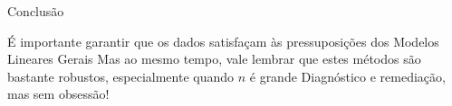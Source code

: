 \documentclass{beamer}\usepackage[]{graphicx}\usepackage[]{color}
\begin{document}
\begin{frame}{Conclusão}

É importante garantir que os dados satisfaçam às pressuposições dos Modelos Lineares Gerais\pause
\vfill
Mas ao mesmo tempo, vale lembrar que estes métodos são bastante robustos, especialmente quando $n$ é grande \pause
\vfill
Diagnóstico e remediação, mas sem obsessão! \pause
\vfill

\end{frame}
\end{document}
